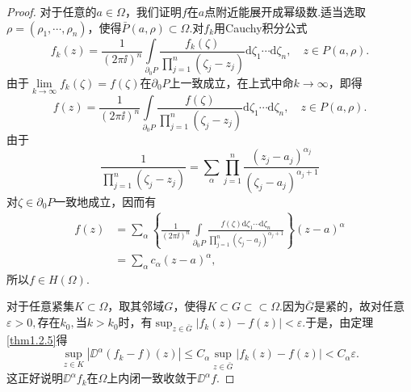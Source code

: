 \begin{proof}
	对于任意的$a\in\Omega$，我们证明$f$在$a$点附近能展开成幂级数.适当选取$\rho=(\rho_1,\cdots,\rho_n)$，使得$\bar{P}(a,\rho)\subset\Omega$.对$f_k$用Cauchy积分公式
	\[f_k(z)=\frac1{(2\pi\ii)^n}\int\limits_{\partial_0 P}\frac{f_k(\zeta)}{\prod\limits_{j=1}^n(\zeta_j-z_j)}\mathrm{d}\zeta_1\cdots\mathrm{d}\zeta_n,\quad z\in P(a,\rho).\]
	由于$\lim\limits_{k\to\infty}f_k(\zeta)=f(
	\zeta)$在$\partial_0 P$上一致成立，在上式中命$k\to\infty$，即得
	\[f(z)=\frac1{(2\pi\ii)^n}\int\limits_{\partial_0 P}\frac{f(\zeta)}{\prod\limits_{j=1}^n(\zeta_j-z_j)}\mathrm{d}\zeta_1\cdots\mathrm{d}\zeta_n,\quad z\in P(a,\rho).\]
	由于
	\[\frac1{\prod\limits_{j=1}^{n}(\zeta_j-z_j)}=\sum_\alpha \prod_{j=1}^{n}\frac{(z_j-a_j)^{\alpha_j}}{(\zeta_j-a_j)^{\alpha_j+1}}\]
	对$\zeta\in\partial_0 P$一致地成立，因而有
	\begin{align*}
		f(z)
		&=\sum_\alpha\left\{\frac1{(2\pi\ii)^n}\int\limits_{\partial_0 P}\frac{f(\zeta)\mathrm{d}\zeta_1\cdots\mathrm{d}\zeta_n}{\prod\limits_{j=1}^{n}(\zeta_j-a_j)^{\alpha_j+1}}\right\}(z-a)^\alpha \\
		&=\sum_\alpha c_\alpha (z-a)^\alpha ,
	\end{align*}
所以$f\in H(\Omega).$

对于任意紧集$K\subset\Omega$，取其邻域$G$，使得$K\subset G\subset\subset\Omega.$因为$\bar{G}$是紧的，故对任意$\varepsilon>0,$存在$k_0,$当$k>k_0$时，有$\sup_{z\in \bar{G}}|f_k(z)-f(z)|<\varepsilon.$于是，由定理\ref{thm1.2.5}得
\[\sup_{z\in K}|\DD^\alpha(f_k-f)(z)|\le C_\alpha \sup_{z\in \bar{G}}|f_k(z)-f(z)|<C_\alpha\varepsilon.\]
这正好说明$\DD^\alpha f_k$在$\Omega$上内闭一致收敛于$\DD^\alpha f$.
\end{proof}
